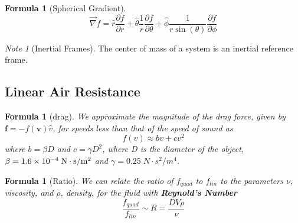 \documentclass[12pt]{article}
\newtheorem{for}[thm]{Formula}
\theoremstyle{definition}
\theoremstyle{remark}
\newtheorem*{note}{Note} %
\numberwithin{equation}{section}
\newcommand\B[1]{\textbf{#1}}
\begin{document}
\vspace{15pt}

\begin{for}[Spherical Gradient]
         \begin{equation}
                \vec{\nabla}f = \hat{r}\frac{\partial f}{\partial r} + \hat{\theta}\frac{1}{r}\frac{\partial f}{\partial \theta} + \hat{\phi}\frac{1}{r\sin(\theta)}\frac{\partial f}{\partial \phi}
        \end{equation}
\end{for}


\vspace{15pt}


\begin{note}[Inertial Frames]
        The center of mass of a system is an inertial reference frame.
\end{note}
\vspace{15pt}


\subsection{Linear Air Resistance}



\begin{for}[drag]
        We approximate the magnitude of the drag force, given by $\B{f}=-f(\B{v})\hat{v}$, for speeds less than that of the speed of sound as \begin{equation}
                f(v) \approx bv + cv^2
        \end{equation}
        where $b = \beta D$ and $c = \gamma D^2$, where D is the diameter of the object, $\beta = \num{1.6E-4}\;\si{N\cdot s/m^2}$ and $\gamma =0.25\;\si{N\cdot s^2/m^4}$.
\end{for}

\vspace{15pt}

\begin{for}[Ratio]
        We can relate the ratio of $f_{quad}$ to $f_{lin}$ to the parameters $\nu$, viscosity, and $\rho$, density, for the fluid with \B{Reynold's Number} \begin{equation}
                \frac{f_{quad}}{f_{lin}} \sim R = \frac{DV\rho}{\nu}
        \end{equation}
\end{for}



\vspace{15pt}
\end{document}

